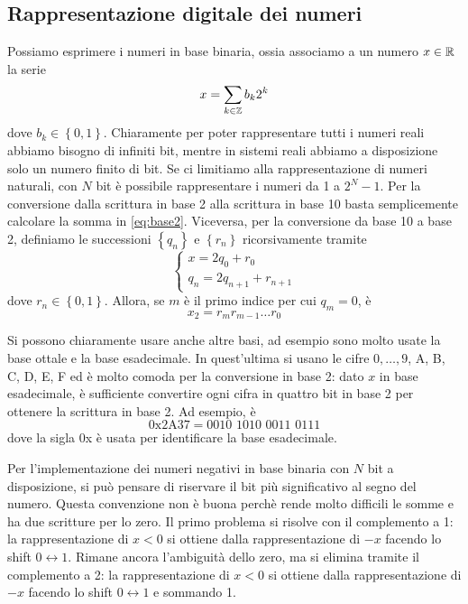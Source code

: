 \documentclass[a4paper, 11pt]{article}
\begin{document}
\subsection{Rappresentazione digitale dei numeri}
Possiamo esprimere i numeri in base binaria, ossia associamo a un numero $x\in \mathbb{R}$ la serie
\begin{equation}\label{eq:base2}x=\sum_{k\in\mathbb{Z}}b_k2^k\end{equation}
dove $b_k\in\left\{0,1\right\}$. Chiaramente per poter rappresentare tutti i numeri reali abbiamo bisogno di infiniti bit, mentre in sistemi reali abbiamo a disposizione solo un numero finito di bit. Se ci limitiamo alla rappresentazione di numeri naturali, con $N$ bit è possibile rappresentare i numeri da 1 a $2^N-1$. Per la conversione dalla scrittura in base 2 alla scrittura in base 10 basta semplicemente calcolare la somma in \ref{eq:base2}. Viceversa, per la conversione da base 10 a base 2, definiamo le successioni $\left\{q_n\right\}$ e $\left\{r_n\right\}$ ricorsivamente tramite
\[\begin{cases}
x=2q_0+r_0\\
q_n=2q_{n+1}+r_{n+1}
\end{cases}\]
dove $r_n\in\left\{0,1\right\}$. Allora, se $m$ è il primo indice per cui $q_m=0$, è
\[x_2=r_mr_{m-1}\ldots r_0\]

Si possono chiaramente usare anche altre basi, ad esempio sono molto usate la base ottale e la base esadecimale. In quest'ultima si usano le cifre $0,\ldots,9$, A, B, C, D, E, F ed è molto comoda per la conversione in base 2: dato $x$ in base esadecimale, è sufficiente convertire ogni cifra in quattro bit in base 2 per ottenere la scrittura in base 2. Ad esempio, è
\[0\mathrm{x}2\mathrm{A}37=0010\,\,1010\,\,0011\,\,0111\]
dove la sigla 0x è usata per identificare la base esadecimale.

Per l'implementazione dei numeri negativi in base binaria con $N$ bit a disposizione, si può pensare di riservare il bit più significativo al segno del numero. Questa convenzione non è buona perchè rende molto difficili le somme e ha due scritture per lo zero. Il primo problema si risolve con il complemento a 1: la rappresentazione di $x<0$ si ottiene dalla rappresentazione di $-x$ facendo lo shift $0\leftrightarrow 1$. Rimane ancora l'ambiguità dello zero, ma si elimina tramite il complemento a 2: la rappresentazione di $x<0$ si ottiene dalla rappresentazione di $-x$ facendo lo shift $0\leftrightarrow1$ e sommando 1.
\end{document}
